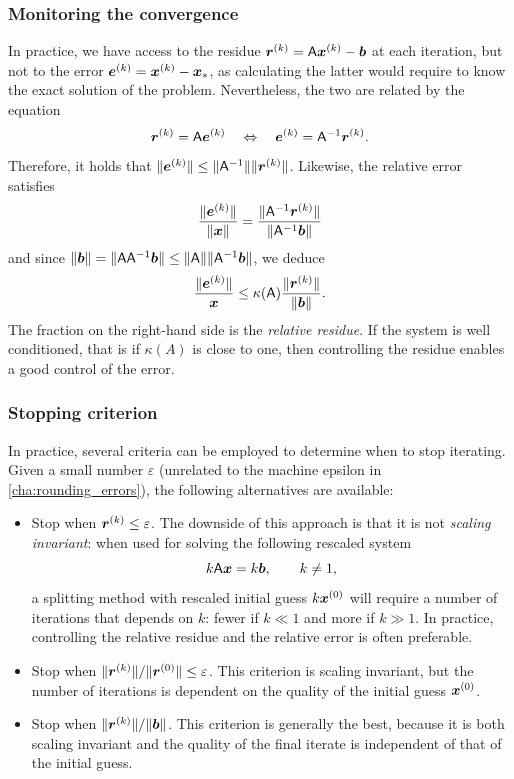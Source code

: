 \subsubsection{Monitoring the convergence}
\label{ssub:monitoring_the_convergence}
In practice,
we have access to the residue $\mathbf{\boldsymbol{r}}^{(k)} = \mathsf A \mathbf{\boldsymbol{x}}^{(k)} - \mathbf{\boldsymbol{b}}$ at each iteration,
but not to the error $\mathbf{\boldsymbol{e}}^{(k)} = \mathbf{\boldsymbol{x}}^{(k)} - \mathbf{\boldsymbol{x}}_*$,
as calculating the latter would require to know the exact solution of the problem.
Nevertheless,
the two are related by the equation
\[
    \mathbf{\boldsymbol{r}}^{(k)} = \mathsf A \mathbf{\boldsymbol{e}}^{(k)}
    \quad \Leftrightarrow \quad \mathbf{\boldsymbol{e}}^{(k)} = \mathsf A^{-1} \mathbf{\boldsymbol{r}}^{(k)}.
\]
Therefore, it holds that $\lVert\mathbf{\boldsymbol{e}}^{(k)}\rVert \leq \lVert\mathsf A^{-1}\rVert \lVert\mathbf{\boldsymbol{r}}^{(k)}\rVert$.
Likewise, the relative error satisfies
\[
     \frac{\lVert\mathbf{\boldsymbol{e}}^{(k)}\rVert}{\lVert\mathbf{\boldsymbol{x}}\rVert}
     = \frac{\lVert\mathsf A^{-1} \mathbf{\boldsymbol{r}}^{(k)}\rVert}{\lVert\mathsf A^{-1} \mathbf{\boldsymbol{b}}\rVert}
\]
and since $\lVert\mathbf{\boldsymbol{b}}\rVert = \lVert\mathsf A \mathsf A^{-1} \mathbf{\boldsymbol{b}}\rVert \leq \lVert\mathsf A\rVert \lVert\mathsf A^{-1} \mathbf{\boldsymbol{b}}\rVert$,
we deduce
\[
     \frac{\lVert\mathbf{\boldsymbol{e}}^{(k)}\rVert}{\mathbf{\boldsymbol{x}}}
     \leq \kappa(\mathsf A) \frac{\lVert\mathbf{\boldsymbol{r}}^{(k)}\rVert}{\lVert\mathbf{\boldsymbol{b}}\rVert}.
\]
The fraction on the right-hand side is the \emph{relative residue}.
If the system is well conditioned,
that is if $\kappa(A)$ is close to one,
then controlling the residue enables a good control of the error.

\subsubsection{Stopping criterion}%
\label{ssub:stopping_criterion}

In practice,
several criteria can be employed to determine when to stop iterating.
Given a small number $\varepsilon$ (unrelated to the machine epsilon in \cref{cha:rounding_errors}),
the following alternatives are available:
\begin{itemize}
    \item
        Stop when $\mathbf{\boldsymbol{r}}^{(k)} \leq \varepsilon$.
        The downside of this approach is that
        it is not \emph{scaling invariant}:
        when used for solving the following rescaled system
        \[
            k \mathsf A \mathbf{\boldsymbol{x}} = k \mathbf{\boldsymbol{b}}, \qquad k \neq 1,
        \]
        a splitting method with rescaled initial guess $k \mathbf{\boldsymbol{x}}^{(0)}$
        will require a number of iterations that depends on $k$:
        fewer if $k \ll 1$ and more if $k \gg 1$.
        In practice, controlling the relative residue and the relative error is often preferable.

    \item
        Stop when $\lVert\mathbf{\boldsymbol{r}}^{(k)}\rVert / \lVert\mathbf{\boldsymbol{r}}^{(0)}\rVert \leq \varepsilon$.
        This criterion is scaling invariant,
        but the number of iterations is dependent on the quality of the initial guess $\mathbf{\boldsymbol{x}}^{(0)}$.

    \item
        Stop when $\lVert\mathbf{\boldsymbol{r}}^{(k)}\rVert / \lVert\mathbf{\boldsymbol{b}}\rVert$.
        This criterion is generally the best,
        because it is both scaling invariant and the quality of the final iterate is independent of that of the initial guess.
\end{itemize}

